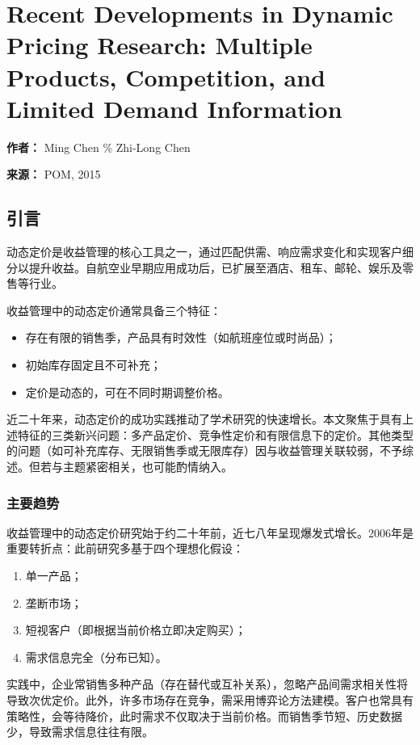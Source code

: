 \section{Recent Developments in Dynamic Pricing Research: Multiple	Products, Competition, and Limited Demand	Information}

\textbf{作者：} Ming Chen  \%  Zhi-Long Chen

\textbf{来源：} POM, 2015


\subsection{引言}\label{introduction}

动态定价是收益管理的核心工具之一，通过匹配供需、响应需求变化和实现客户细分以提升收益。自航空业早期应用成功后，已扩展至酒店、租车、邮轮、娱乐及零售等行业。

收益管理中的动态定价通常具备三个特征：
\begin{itemize}
	\item 存在有限的销售季，产品具有时效性（如航班座位或时尚品）；
	\item 初始库存固定且不可补充；
	\item 定价是动态的，可在不同时期调整价格。
\end{itemize}

近二十年来，动态定价的成功实践推动了学术研究的快速增长。本文聚焦于具有上述特征的三类新兴问题：多产品定价、竞争性定价和有限信息下的定价。其他类型的问题（如可补充库存、无限销售季或无限库存）因与收益管理关联较弱，不予综述。但若与主题紧密相关，也可能酌情纳入。

\subsubsection{主要趋势}\label{major-trends}

收益管理中的动态定价研究始于约二十年前，近七八年呈现爆发式增长。2006年是重要转折点：此前研究多基于四个理想化假设：
\begin{enumerate}
	\def\labelenumi{\roman{enumi}.}
	\item 单一产品；
	\item 垄断市场；
	\item 短视客户（即根据当前价格立即决定购买）；
	\item 需求信息完全（分布已知）。
\end{enumerate}

实践中，企业常销售多种产品（存在替代或互补关系），忽略产品间需求相关性将导致次优定价。此外，许多市场存在竞争，需采用博弈论方法建模。客户也常具有策略性，会等待降价，此时需求不仅取决于当前价格。而销售季节短、历史数据少，导致需求信息往往有限。

